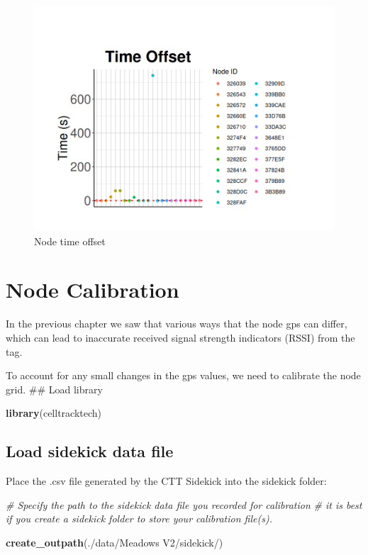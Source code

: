 \documentclass[
]{book}
\newenvironment{Shaded}{\begin{snugshade}}{\end{snugshade}}
\newcommand{\CommentTok}[1]{\textcolor[rgb]{0.56,0.35,0.01}{\textit{#1}}}
\newcommand{\FunctionTok}[1]{\textcolor[rgb]{0.13,0.29,0.53}{\textbf{#1}}}
\newcommand{\NormalTok}[1]{#1}
\newcommand{\StringTok}[1]{\textcolor[rgb]{0.31,0.60,0.02}{#1}}
\begin{document}
\begin{figure}
\centering
\includegraphics{images/node_check_1.4_time_offset.png}
\caption{Node time offset}
\end{figure}

\chapter{Node Calibration}\label{node-calibration}

In the previous chapter we saw that various ways that the node gps can differ, which can lead to inaccurate received signal strength indicators (RSSI) from the tag.

To account for any small changes in the gps values, we need to calibrate the node grid.
\#\# Load library

\begin{Shaded}
\begin{Highlighting}[]
\FunctionTok{library}\NormalTok{(celltracktech)}
\end{Highlighting}
\end{Shaded}

\section{Load sidekick data file}\label{load-sidekick-data-file}

Place the .csv file generated by the CTT Sidekick into the sidekick folder:

\begin{Shaded}
\begin{Highlighting}[]
\CommentTok{\# Specify the path to the sidekick data file you recorded for calibration}
\CommentTok{\# it is best if you create a \textquotesingle{}sidekick\textquotesingle{} folder to store your calibration file(s).}

\FunctionTok{create\_outpath}\NormalTok{(}\StringTok{\textquotesingle{}./data/Meadows V2/sidekick/\textquotesingle{}}\NormalTok{)}
\end{Highlighting}
\end{Shaded}
\end{document}
